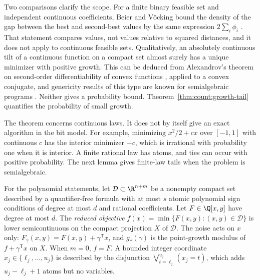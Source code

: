 Two comparisons clarify the scope. For a finite binary feasible set and
independent continuous coefficients, Beier and V\"ocking bound the density of
the gap between the best and second-best values by the same expression
$2\sum_i\phi_i$ \cite{beier2006-typical-properties-of-winners-and}. That
statement compares values, not values relative to squared distances, and it
does not apply to continuous feasible sets. Qualitatively, an absolutely
continuous tilt of a continuous function on a compact set almost surely has
a unique minimizer with positive growth. This can be deduced from
Alexandrov's theorem on second-order differentiability of convex functions
\cite{azagra2023-a-geometric-approach-to-second}, applied to a convex
conjugate, and genericity results of this type are known for semialgebraic
programs \cite{lee2016-stability-and-genericity-for-semi}. Neither gives a
probability bound. Theorem~\ref{thm:count:growth-tail} quantifies the
probability of small growth.

The theorem concerns continuous laws. It does not by itself give an exact
algorithm in the bit model. For example, minimizing $x^2/2+cx$ over $[-1,1]$
with continuous $c$ has the interior minimizer $-c$, which is irrational with
probability one when it is interior. A finite rational law has atoms, and
ties can occur with positive probability. The next lemma gives finite-law
tails when the problem is semialgebraic.

For the polynomial statements, let $\mathcal D\subset\R^{n+m}$ be a nonempty
compact set described by a quantifier-free formula with at most $s$ atomic
polynomial sign conditions of degree at most $d$ and rational coefficients.
Let $F\in\Q[x,y]$ have degree at most $d$. The \emph{reduced objective}
$f(x)=\min\{F(x,y):(x,y)\in\mathcal D\}$ is lower semicontinuous on the
compact projection $X$ of $\mathcal D$. The noise acts on $x$ only:
$F_\gamma(x,y)=F(x,y)+\gamma^{\mathsf T} x$, and $g_*(\gamma)$ is the point-growth
modulus of $f+\gamma^{\mathsf T} x$ on $X$. When $m=0$, $f=F$. A bounded integer
coordinate $x_j\in\{\ell_j,\dots,u_j\}$ is described by the disjunction
$\bigvee_{t=\ell_j}^{u_j}(x_j=t)$, which adds $u_j-\ell_j+1$ atoms but no
variables.

